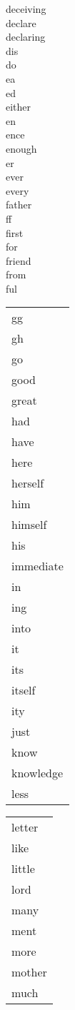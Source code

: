 \documentclass[draft]{article}
\makeatletter
\newcommand{\mytaglist}[1]{%
    \enskip\begin{tabular}[t]{@{}l@{}}
    #1
    \end{tabular}\enskip}
\makeatother
\begin{document}
\begin{center}
{deceiving \\
declare \\
declaring \\
dis \\
do \\
ea \\
ed \\
either \\
en \\
ence \\
enough \\
er \\
ever \\
every \\
father \\
ff \\
first \\
for \\
friend \\
from \\
ful \\
}
\mytaglist{
gg \\
gh \\
go \\
good \\
great \\
had \\
have \\
here \\
herself \\
him \\
himself \\
his \\
immediate \\
in \\
ing \\
into \\
it \\
its \\
itself \\
ity \\
just \\
know \\
knowledge \\
less \\
}
\mytaglist{
letter \\
like \\
little \\
lord \\
many \\
ment \\
more \\
mother \\
much \\
}
\end{center}
\end{document}
